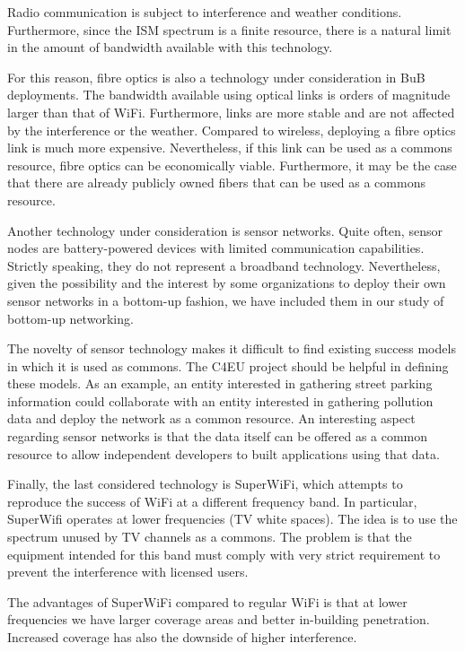 \documentclass[conference]{IEEEtran}
\begin{document}
Radio communication is subject to interference and weather conditions.
Furthermore, since the ISM spectrum is a finite resource, there is a natural limit in the amount of bandwidth available with this technology.

For this reason, fibre optics is also a technology under consideration in BuB deployments.
The bandwidth available using optical links is orders of magnitude larger than that of WiFi.
Furthermore, links are more stable and are not affected by the interference or the weather.
Compared to wireless, deploying a fibre optics link is much more expensive.
Nevertheless, if this link can be used as a commons resource, fibre optics can be economically viable.
Furthermore, it may be the case that there are already publicly owned fibers that can be used as a commons resource.

Another technology under consideration is sensor networks.
Quite often, sensor nodes are battery-powered devices with limited communication capabilities.
Strictly speaking, they do not represent a broadband technology.
Nevertheless, given the possibility and the interest by some organizations to deploy their own sensor networks in a bottom-up fashion, we have included them in our study of bottom-up networking.

The novelty of sensor technology makes it difficult to find existing success models in which it is used as commons.
The C4EU project should be helpful in defining these models.
As an example, an entity interested in gathering street parking information could collaborate with an entity interested in gathering pollution data and deploy the network as a common resource.
An interesting aspect regarding sensor networks is that the data itself can be offered as a common resource to allow independent developers to built applications using that data.

Finally, the last considered technology is SuperWiFi, which attempts to reproduce the success of WiFi at a different frequency band.
In particular, SuperWifi operates at lower frequencies (TV white spaces).
The idea is to use the spectrum unused by TV channels as a commons.
The problem is that the equipment intended for this band must comply with very strict requirement to prevent the interference with licensed users.

The advantages of SuperWiFi compared to regular WiFi is that at lower frequencies we have larger coverage areas and better in-building penetration.
Increased coverage has also the downside of higher interference.
\end{document}
